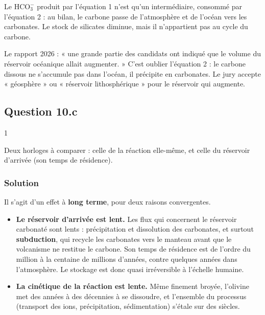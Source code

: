 \documentclass[11pt,a4paper]{article}
\providecommand{\tightlist}{\setlength{\itemsep}{0pt}\setlength{\parskip}{0pt}}
\begin{document}
Le \(\mathrm{HCO_3^-}\) produit par l'équation 1 n'est qu'un intermédiaire, consommé par l'équation 2 : au bilan, le carbone passe de l'atmosphère et de l'océan vers les carbonates. Le stock de silicates diminue, mais il n'appartient pas au cycle du carbone.

\begin{piege}

Le rapport 2026 : « une grande partie des candidats ont indiqué que le volume du réservoir océanique allait augmenter. » C'est oublier l'équation 2 : le carbone dissous ne s'accumule pas dans l'océan, il précipite en carbonates. Le jury accepte « géosphère » ou « réservoir lithosphérique » pour le réservoir qui augmente.

\end{piege}

\hypertarget{question-10.c}{%
\subsection{Question 10.c}\label{question-10.c}}

\begin{indication}{1}

Deux horloges à comparer : celle de la réaction elle-même, et celle du réservoir d'arrivée (son temps de résidence).

\end{indication}

\hypertarget{solution-32}{%
\subsubsection{Solution}\label{solution-32}}

Il s'agit d'un effet à \textbf{long terme}, pour deux raisons convergentes.

\begin{itemize}
\tightlist
\item
  \textbf{Le réservoir d'arrivée est lent.} Les flux qui concernent le réservoir carbonaté sont lents : précipitation et dissolution des carbonates, et surtout \textbf{subduction}, qui recycle les carbonates vers le manteau avant que le volcanisme ne restitue le carbone. Son temps de résidence est de l'ordre du million à la centaine de millions d'années, contre quelques années dans l'atmosphère. Le stockage est donc quasi irréversible à l'échelle humaine.
\item
  \textbf{La cinétique de la réaction est lente.} Même finement broyée, l'olivine met des années à des décennies à se dissoudre, et l'ensemble du processus (transport des ions, précipitation, sédimentation) s'étale sur des siècles.
\end{itemize}
\end{document}
